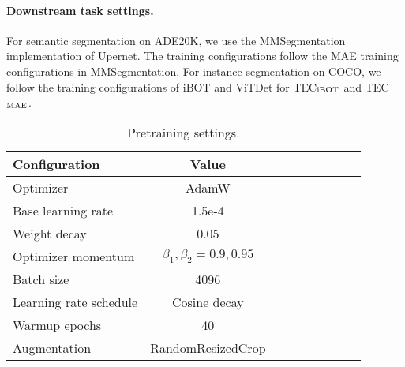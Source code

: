 \documentclass{article} \usepackage{iclr2023_conference,times}
\begin{document}
\paragraph{Downstream task settings.}
For semantic segmentation on ADE20K, 
we use the MMSegmentation~\citep{mmseg2020} implementation of Upernet.
The training configurations follow the MAE training configurations in MMSegmentation.
For instance segmentation on COCO,
we follow the training configurations of iBOT and ViTDet
for TEC$_{\rm iBOT}$ and TEC$_{\rm MAE}$.


\begin{table}[h]
	\centering
	\setlength{\tabcolsep}{8mm}
	\caption{Pretraining settings.
	}
	\small
	\begin{tabular}{lcccccccc}
		\toprule
        Configuration      & Value \\	\midrule
        Optimizer & AdamW  \\
        Base learning rate & 1.5e-4 \\
        Weight decay & 0.05 \\
        Optimizer momentum & $\beta_1, \beta_2{=}0.9, 0.95$  \\
        Batch size & 4096 \\
        Learning rate schedule & Cosine decay\\
        Warmup epochs  & 40 \\
        Augmentation & RandomResizedCrop \\
		\bottomrule
	\end{tabular}
	\label{tab:pretrain_weights}
\end{table}
\end{document}
